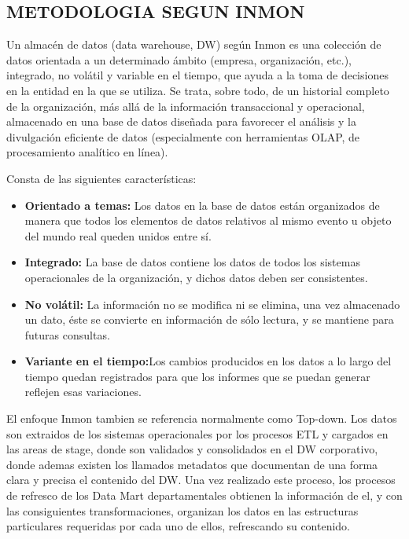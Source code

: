 \documentclass[%
 reprint,
 amsmath,amssymb,
 aps,
]{revtex4-1}
\begin{document}
\subsection{METODOLOGIA SEGUN INMON}	
Un almacén de datos (data warehouse, DW) según Inmon es una colección de datos orientada a un determinado ámbito (empresa, organización, etc.), integrado, no volátil y variable en el tiempo, que ayuda a la toma de decisiones en la entidad en la que se utiliza. Se trata, sobre todo, de un historial completo de la organización, más allá de la información transaccional y operacional, almacenado en una base de datos diseñada para favorecer el análisis y la divulgación eficiente de datos (especialmente con herramientas OLAP, de procesamiento analítico en línea).

Consta de las siguientes características:
\begin{itemize}
		\item \textbf{Orientado a temas:} Los datos en la base de datos están organizados de manera que todos los elementos de datos relativos al mismo evento u objeto del mundo real queden unidos entre sí.
		\item \textbf{Integrado:} La base de datos contiene los datos de todos los sistemas operacionales de la organización, y dichos datos deben ser consistentes. 
		\item \textbf{No volátil:} La información no se modifica ni se elimina, una vez almacenado un dato, éste se convierte en información de sólo lectura, y se 	mantiene para futuras consultas.
		\item \textbf{Variante en el tiempo:}Los cambios producidos en los datos a lo largo del tiempo quedan registrados para que los informes que se puedan generar reflejen esas variaciones.

\end{itemize}


El enfoque Inmon tambien se referencia normalmente como Top-down. Los datos son extraidos de los sistemas operacionales por los procesos ETL y cargados en las areas de stage, donde son validados y consolidados en el DW corporativo, donde ademas existen los llamados metadatos que documentan de una forma clara y precisa el contenido del DW. Una vez realizado este proceso, los procesos de refresco de los Data Mart departamentales obtienen la información de el, y con las consiguientes transformaciones, organizan los datos en las estructuras particulares requeridas por cada uno de ellos, refrescando su contenido.


\end{document}
